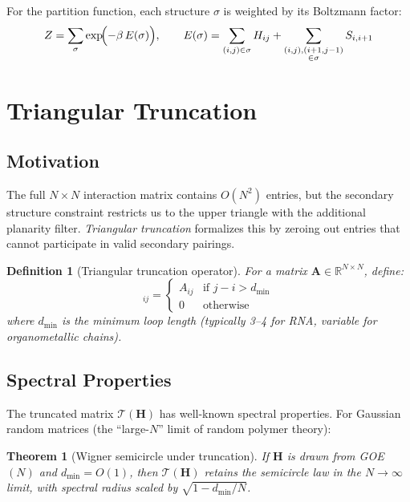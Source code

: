\documentclass[11pt]{article}
\newtheorem{definition}{Definition}[section]
\newtheorem{theorem}{Theorem}[section]
\begin{document}
For the partition function, each structure $\sigma$ is weighted by its
Boltzmann factor:
\begin{equation}
  Z = \sum_{\sigma} \exp\!\Bigl(-\beta\, E(\sigma)\Bigr),
  \qquad
  E(\sigma) = \sum_{(i,j) \in \sigma} H_{ij}
            + \sum_{\substack{(i,j),(i+1,j-1) \\ \in \sigma}} S_{i,i+1}
\end{equation}

\section{Triangular Truncation}

\subsection{Motivation}

The full $N \times N$ interaction matrix contains $O(N^2)$ entries, but
the secondary structure constraint restricts us to the upper triangle
with the additional planarity filter.  \emph{Triangular truncation}
formalizes this by zeroing out entries that cannot participate in valid
secondary pairings.

\begin{definition}[Triangular truncation operator]
For a matrix $\mathbf{A} \in \mathbb{R}^{N \times N}$, define:
\begin{equation}
  [\mathcal{T}(\mathbf{A})]_{ij} =
  \begin{cases}
    A_{ij} & \text{if } j - i > d_{\min} \\
    0      & \text{otherwise}
  \end{cases}
\end{equation}
where $d_{\min}$ is the minimum loop length (typically 3--4 for RNA,
variable for organometallic chains).
\end{definition}

\subsection{Spectral Properties}

The truncated matrix $\mathcal{T}(\mathbf{H})$ has well-known spectral
properties.  For Gaussian random matrices (the ``large-$N$'' limit of
random polymer theory):

\begin{theorem}[Wigner semicircle under truncation]
If $\mathbf{H}$ is drawn from GOE$(N)$ and $d_{\min} = O(1)$, then
$\mathcal{T}(\mathbf{H})$ retains the semicircle law in the
$N \to \infty$ limit, with spectral radius scaled by
$\sqrt{1 - d_{\min}/N}$.
\end{theorem}
\end{document}
